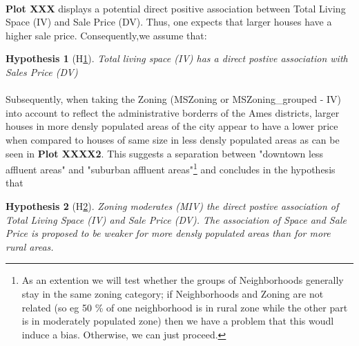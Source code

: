 \documentclass{article}
\newtheorem{hyp}{Hypothesis}
\begin{document}
\indent \paragraph{} \textbf{Plot XXX} displays a potential direct positive association between Total Living Space (IV) and Sale Price (DV). Thus, one expects that larger houses have a higher sale price. Consequently,we assume that:

\begin{hyp}[H\ref{hyp:first}] \label{hyp:first}
Total living space (IV) has a direct postive association with Sales Price (DV)
\end{hyp}

\begin{center}
\end{center}


\indent \paragraph{} Subsequently, when taking the Zoning (MSZoning or MSZoning\_grouped - IV) into account to reflect the administrative borderrs of the Ames districts, larger houses in more densly populated areas of the city appear to have a lower price when compared to houses of same size in less densly populated areas as can be seen in \textbf{Plot XXXX2}. This suggests a separation between "downtown less affluent areas" and "suburban affluent areas"\footnote{As an extention\: we will test whether the groups of Neighborhoods generally stay in the same zoning category; if Neighborhoods and Zoning are not related (so eg 50 \% of one neighborhood is in rural zone while the other part is in moderately populated zone) then we have a problem that this woudl induce a bias. Otherwise, we can just proceed.} and concludes in the hypothesis that

\begin{hyp}[H\ref{hyp:second}] \label{hyp:second}
Zoning moderates (MIV) the direct postive association of Total Living Space (IV) and Sale Price (DV). The association of Space and Sale Price is proposed to be weaker for more densly populated areas than for more rural areas. 
\end{hyp}
\end{document}
